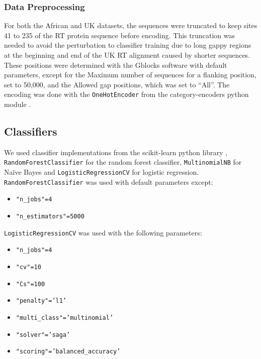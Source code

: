 \documentclass[
  11pt,
  twoside,
  BCOR=10mm,
  listof=totoc]{scrbook}
\providecommand{\tightlist}{%
  \setlength{\itemsep}{0pt}\setlength{\parskip}{0pt}}
\begin{document}
\hypertarget{data-preprocessing}{%
\subsubsection{Data Preprocessing}\label{data-preprocessing}}

For both the African and UK datasets, the sequences were truncated to keep sites 41 to 235 of the RT protein sequence before encoding. This truncation was needed to avoid the perturbation to classifier training due to long gappy regions at the beginning and end of the UK RT alignment caused by shorter sequences. These positions were determined with the Gblocks software \autocite{castresanaSelectionConservedBlocks2000} with default parameters, except for the Maximum number of sequences for a flanking position, set to 50,000, and the Allowed gap positions, which was set to ``All''. The encoding was done with the \texttt{OneHotEncoder} from the category-encoders python module \autocite{mcginnisScikitLearnContribCategoricalEncodingRelease2018}.

\hypertarget{classifiers}{%
\subsection{Classifiers}\label{classifiers}}

We used classifier implementations from the scikit-learn python library \autocite{pedregosaScikitlearnMachineLearning2011}, \texttt{RandomForestClassifier} for the random forest classifier, \texttt{MultinomialNB} for Naïve Bayes and \texttt{LogisticRegressionCV} for logistic regression.\\
\texttt{RandomForestClassifier} was used with default parameters except:

\begin{itemize}
\tightlist
\item
  \texttt{"n\_jobs"=4}
\item
  \texttt{"n\_estimators"=5000}
\end{itemize}

\texttt{LogisticRegressionCV} was used with the following parameters:

\begin{itemize}
\tightlist
\item
  \texttt{"n\_jobs"=4}
\item
  \texttt{"cv"=10}
\item
  \texttt{"Cs"=100}
\item
  \texttt{"penalty"=’l1’}
\item
  \texttt{"multi\_class"=’multinomial’}
\item
  \texttt{"solver"=’saga’}
\item
  \texttt{"scoring"=’balanced\_accuracy’}
\end{itemize}
\end{document}

